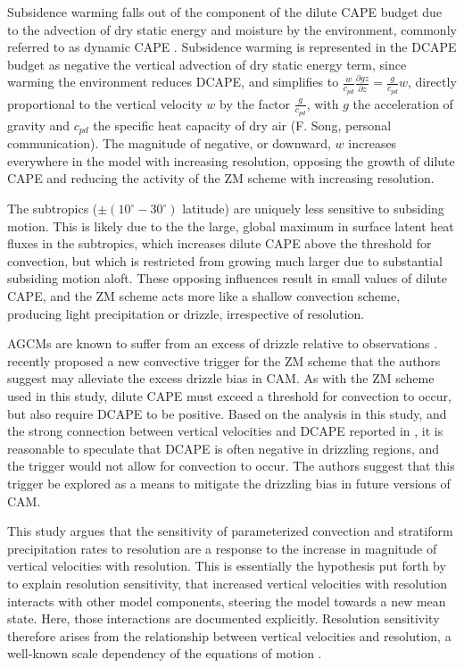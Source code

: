 \documentclass[alpha-refs]{wiley-article}
\begin{document}
Subsidence warming falls out of the component of the dilute CAPE budget due to the advection of dry static energy and moisture by the environment, commonly referred to as dynamic CAPE \citep[DCAPE;][]{XZ2000JGR,Z2002JGR}. Subsidence warming is represented in the DCAPE budget as negative the vertical advection of dry static energy term, since warming the environment reduces DCAPE, and simplifies to $\frac{w}{c_{pd}} \frac{\partial gz}{\partial z} = \frac{g}{c_{pd}} w$, directly proportional to the vertical velocity $w$ by the factor $\frac{g}{c_{pd}}$, with $g$ the acceleration of gravity and $c_{pd}$ the specific heat capacity of dry air (F. Song, personal communication). The magnitude of negative, or downward, $w$ increases everywhere in the model with increasing resolution, opposing the growth of dilute CAPE and reducing the activity of the ZM scheme with increasing resolution.

The subtropics ($\pm (10^{\circ}-30^{\circ})$ latitude) are uniquely less sensitive to subsiding motion. This is likely due to the the large, global maximum in surface latent heat fluxes in the subtropics, which increases dilute CAPE above the threshold for convection, but which is restricted from growing much larger due to substantial subsiding motion aloft. These opposing influences result in small values of dilute CAPE, and the ZM scheme acts more like a shallow convection scheme, producing light precipitation or drizzle, irrespective of resolution. 

AGCMs are known to suffer from an excess of drizzle relative to observations \citep{D2006JCLIM}. \cite{XETAL2019JAMES} recently proposed a new convective trigger for the ZM scheme that the authors suggest may alleviate the excess drizzle bias in CAM. As with the ZM scheme used in this study, dilute CAPE must exceed a threshold for convection to occur, but \cite{XETAL2019JAMES} also require DCAPE to be positive. Based on the analysis in this study, and the strong connection between vertical velocities and DCAPE reported in \cite{SZ2018JCLIM}, it is reasonable to speculate that DCAPE is often negative in drizzling regions, and the \cite{XETAL2019JAMES} trigger would not allow for convection to occur. The authors suggest that this trigger be explored as a means to mitigate the drizzling bias in future versions of CAM.

This study argues that the sensitivity of parameterized convection and stratiform precipitation rates to resolution are a response to the increase in magnitude of vertical velocities with resolution. This is essentially the hypothesis put forth by \cite{HR2017JCLIM} to explain resolution sensitivity, that increased vertical velocities with resolution interacts with other model components, steering the model towards a new mean state. Here, those interactions are documented explicitly. Resolution sensitivity therefore arises from the relationship between vertical velocities and resolution, a well-known scale dependency of the equations of motion \citep{O1981JAS}.
\end{document}
